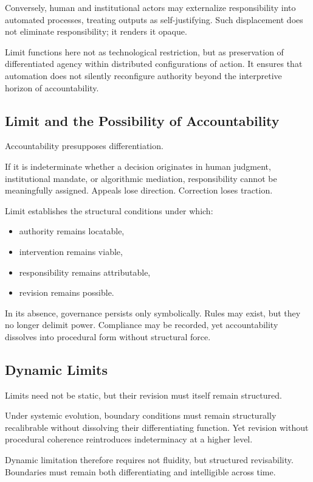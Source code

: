 \documentclass[12pt]{article}
\begin{document}
Conversely, human and institutional actors may externalize responsibility into automated processes, treating outputs as self-justifying. Such displacement does not eliminate responsibility; it renders it opaque.

Limit functions here not as technological restriction, but as preservation of differentiated agency within distributed configurations of action. It ensures that automation does not silently reconfigure authority beyond the interpretive horizon of accountability.

\subsection{Limit and the Possibility of Accountability}


Accountability presupposes differentiation.

If it is indeterminate whether a decision originates in human judgment, institutional mandate, or algorithmic mediation, responsibility cannot be meaningfully assigned. Appeals lose direction. Correction loses traction.

Limit establishes the structural conditions under which:

\begin{itemize}
\item authority remains locatable,
\item intervention remains viable,
\item responsibility remains attributable,
\item revision remains possible.
\end{itemize}

In its absence, governance persists only symbolically. Rules may exist, but they no longer delimit power. Compliance may be recorded, yet accountability dissolves into procedural form without structural force.

\subsection{Dynamic Limits}


Limits need not be static, but their revision must itself remain structured.

Under systemic evolution, boundary conditions must remain structurally recalibrable without dissolving their differentiating function. Yet revision without procedural coherence reintroduces indeterminacy at a higher level.

Dynamic limitation therefore requires not fluidity, but structured revisability. Boundaries must remain both differentiating and intelligible across time.
\end{document}
